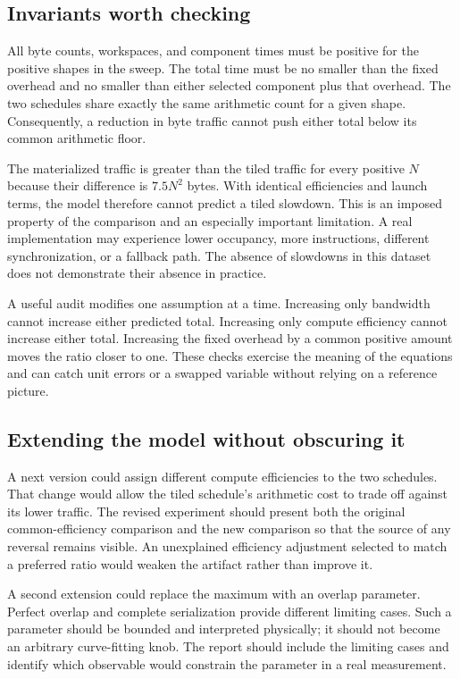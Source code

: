 \subsection{Invariants worth checking}
All byte counts, workspaces, and component times must be positive for the positive shapes in the sweep. The total time must be no smaller than the fixed overhead and no smaller than either selected component plus that overhead. The two schedules share exactly the same arithmetic count for a given shape. Consequently, a reduction in byte traffic cannot push either total below its common arithmetic floor.

The materialized traffic is greater than the tiled traffic for every positive $N$ because their difference is $7.5N^2$ bytes. With identical efficiencies and launch terms, the model therefore cannot predict a tiled slowdown. This is an imposed property of the comparison and an especially important limitation. A real implementation may experience lower occupancy, more instructions, different synchronization, or a fallback path. The absence of slowdowns in this dataset does not demonstrate their absence in practice.

A useful audit modifies one assumption at a time. Increasing only bandwidth cannot increase either predicted total. Increasing only compute efficiency cannot increase either total. Increasing the fixed overhead by a common positive amount moves the ratio closer to one. These checks exercise the meaning of the equations and can catch unit errors or a swapped variable without relying on a reference picture.

\subsection{Extending the model without obscuring it}
A next version could assign different compute efficiencies to the two schedules. That change would allow the tiled schedule's arithmetic cost to trade off against its lower traffic. The revised experiment should present both the original common-efficiency comparison and the new comparison so that the source of any reversal remains visible. An unexplained efficiency adjustment selected to match a preferred ratio would weaken the artifact rather than improve it.

A second extension could replace the maximum with an overlap parameter. Perfect overlap and complete serialization provide different limiting cases. Such a parameter should be bounded and interpreted physically; it should not become an arbitrary curve-fitting knob. The report should include the limiting cases and identify which observable would constrain the parameter in a real measurement.

